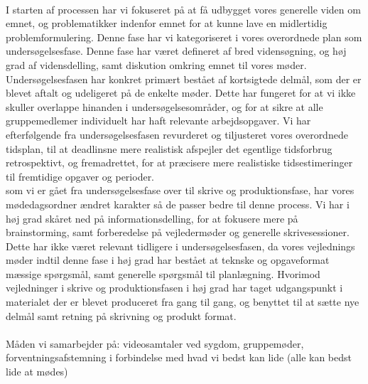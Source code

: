 \documentclass[12pt,a4paper]{article}
\begin{document}
\\
 I starten af processen har vi fokuseret på at få udbygget vores generelle viden om emnet, og problematikker indenfor emnet for at kunne lave en midlertidig problemformulering. Denne fase har vi kategoriseret i vores overordnede plan som undersøgelsesfase. Denne fase har været defineret af bred vidensøgning, og høj grad af vidensdelling, samt diskution omkring emnet til vores møder. 
 Undersøgelsesfasen har konkret primært bestået af kortsigtede delmål, som der er blevet aftalt og udeligeret på de enkelte møder. Dette har fungeret for at vi ikke skuller overlappe hinanden i undersøgelsesområder, og for at sikre at alle gruppemedlemer individuelt har haft relevante arbejdsopgaver. Vi har efterfølgende fra undersøgelsesfasen revurderet og tiljusteret vores overordnede tidsplan, til at deadlinsne mere realistisk afspejler det egentlige tidsforbrug retrospektivt, og fremadrettet, for at præcisere mere realistiske tidsestimeringer til fremtidige opgaver og perioder.  
\\
som vi er gået fra undersøgelsesfase over til skrive og produktionsfase, har vores mødedagsordner ændret karakter så de passer bedre til denne process. Vi har i høj grad skåret ned på informationsdelling, for at fokusere mere på brainstorming, samt forberedelse på vejledermøder og generelle skrivesessioner. Dette har ikke været relevant tidligere i undersøgelsesfasen, da vores vejlednings møder indtil denne fase i høj grad har bestået at teknske og opgaveformat mæssige spørgsmål, samt generelle spørgsmål til planlægning. Hvorimod vejledninger i skrive og produktionsfasen i høj grad har taget udgangspunkt i materialet der er blevet produceret fra gang til gang, og benyttet til at sætte nye delmål samt retning på skrivning og produkt format. 
\\
\\


Måden vi samarbejder på: videosamtaler ved sygdom, 
gruppemøder, forventningsafstemning i forbindelse med hvad vi bedst kan lide (alle kan bedst lide at mødes)
\end{document}
